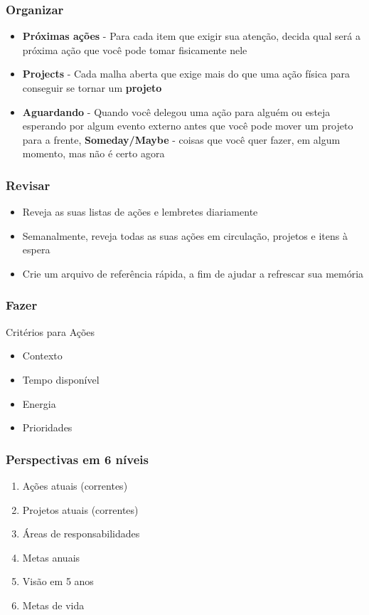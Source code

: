 \documentclass{beamer}
\begin{document}
\begin{frame}[t]\frametitle{Organizar}
	\begin{itemize}
		\item \textbf{Próximas ações} - Para cada item que exigir sua atenção, decida qual será a próxima ação que você pode tomar fisicamente nele
		\item \textbf{Projects} - Cada malha aberta que exige mais do que uma ação física para conseguir se tornar um \textbf{projeto}

		\item \textbf{Aguardando} - Quando você delegou uma ação para alguém ou esteja esperando por algum evento externo antes que você pode mover um projeto para a frente, \textbf{Someday/Maybe} - coisas que você quer fazer, em algum momento, mas não é certo agora
	\end{itemize}
\end{frame}

\begin{frame}[t]\frametitle{Revisar}
    \begin{itemize}
    	\item Reveja as suas listas de ações e lembretes diariamente

		\item Semanalmente, reveja todas as suas ações em circulação, projetos e itens à espera

		\item Crie um arquivo de referência rápida, a fim de ajudar a refrescar sua memória
    \end{itemize}
\end{frame}

\begin{frame}[t]\frametitle{Fazer}
	Critérios para Ações
    \begin{itemize}
    	\item Contexto
    	\item Tempo disponível
    	\item Energia
    	\item Prioridades
    \end{itemize}
\end{frame}

\begin{frame}[t]\frametitle{Perspectivas em 6 níveis}
\begin{enumerate}
	\item Ações atuais (correntes)
	\item Projetos atuais (correntes)
	\item Áreas de responsabilidades
	\item Metas anuais
	\item Visão em 5 anos
	\item Metas de vida
\end{enumerate}
\end{frame}
\end{document}
